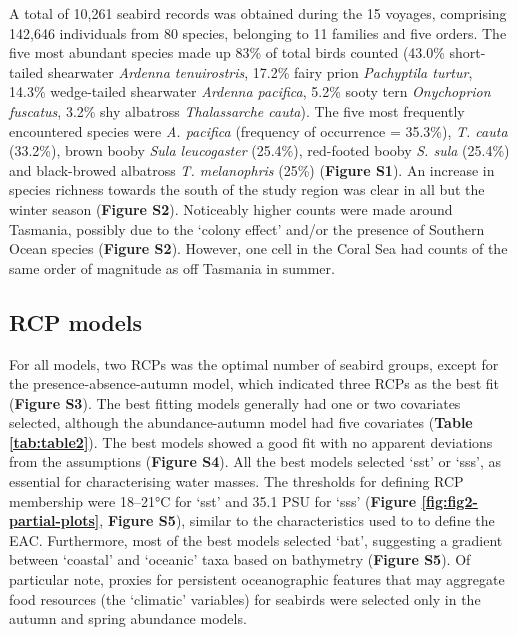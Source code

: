 \documentclass{article}
\begin{document}
\begin{linenumbers}
A total of 10,261 seabird records was obtained during the 15 voyages, comprising 142,646 individuals from 80 species, belonging to 11 families and five orders. The five most abundant species made up 83\% of total birds counted (43.0\% short-tailed shearwater \emph{Ardenna tenuirostris}, 17.2\% fairy prion \emph{Pachyptila turtur}, 14.3\% wedge-tailed shearwater \emph{Ardenna pacifica}, 5.2\% sooty tern \emph{Onychoprion fuscatus}, 3.2\% shy albatross \emph{Thalassarche cauta}). The five most frequently encountered species were \emph{A. pacifica} (frequency of occurrence = 35.3\%), \emph{T. cauta} (33.2\%), brown booby \emph{Sula leucogaster} (25.4\%), red-footed booby \emph{S. sula} (25.4\%) and black-browed albatross \emph{T. melanophris} (25\%) (\textbf{Figure S1}). An increase in species richness towards the south of the study region was clear in all but the winter season (\textbf{Figure S2}). Noticeably higher counts were made around Tasmania, possibly due to the `colony effect' and/or the presence of Southern Ocean species (\textbf{Figure S2}). However, one cell in the Coral Sea had counts of the same order of magnitude as off Tasmania in summer.

\hypertarget{rcp-models}{%
\subsection{RCP models}\label{rcp-models}}

For all models, two RCPs was the optimal number of seabird groups, except for the presence-absence-autumn model, which indicated three RCPs as the best fit (\textbf{Figure S3}). The best fitting models generally had one or two covariates selected, although the abundance-autumn model had five covariates (\textbf{Table \ref{tab:table2}}). The best models showed a good fit with no apparent deviations from the assumptions (\textbf{Figure S4}). All the best models selected `sst' or `sss', as essential for characterising water masses. The thresholds for defining RCP membership were 18--21°C for `sst' and 35.1 PSU for `sss' (\textbf{Figure \ref{fig:fig2-partial-plots}}, \textbf{Figure S5}), similar to the characteristics used to to define the EAC. Furthermore, most of the best models selected `bat', suggesting a gradient between `coastal' and `oceanic' taxa based on bathymetry (\textbf{Figure S5}). Of particular note, proxies for persistent oceanographic features that may aggregate food resources (the `climatic' variables) for seabirds were selected only in the autumn and spring abundance models.


\end{linenumbers}
\end{document}
